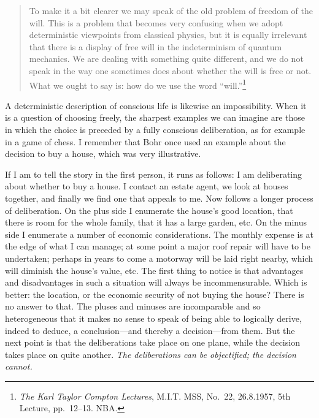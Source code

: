 \documentclass[12pt,a4paper]{book}
\begin{document}
\begin{quote}
To make it a bit clearer we may speak of the old problem of freedom of the will. This is a problem that becomes very confusing when we adopt deterministic viewpoints from classical physics, but it is equally irrelevant that there is a display of free will in the indeterminism of quantum mechanics. We are dealing with something quite different, and we do not speak in the way one sometimes does about whether the will is free or not. What we ought to say is: how do we use the word ``will.''\footnote{\emph{The Karl Taylor Compton Lectures}, M.I.T. MSS, No.~22, 26.8.1957, 5th Lecture, pp.~12--13. NBA.}
\end{quote}

A deterministic description of conscious life is likewise an impossibility. When it is a question of choosing freely, the sharpest examples we can imagine are those in which the choice is preceded by a fully conscious deliberation, as for example in a game of chess. I remember that Bohr once used an example about the decision to buy a house, which was very illustrative.

If I am to tell the story in the first person, it runs as follows: I am deliberating about whether to buy a house. I contact an estate agent, we look at houses together, and finally we find one that appeals to me. Now follows a longer process of deliberation. On the plus side I enumerate the house's good location, that there is room for the whole family, that it has a large garden, etc. On the minus side I enumerate a number of economic considerations. The monthly expense is at the edge of what I can manage; at some point a major roof repair will have to be undertaken; perhaps in years to come a motorway will be laid right nearby, which will diminish the house's value, etc. The first thing to notice is that advantages and disadvantages in such a situation will always be incommensurable. Which is better: the location, or the economic security of not buying the house? There is no answer to that. The pluses and minuses are incomparable and so heterogeneous that it makes no sense to speak of being able to logically derive, indeed to deduce, a conclusion---and thereby a decision---from them. But the next point is that the deliberations take place on one plane, while the decision takes place on quite another. \emph{The deliberations can be objectified; the decision cannot.}
\end{document}
